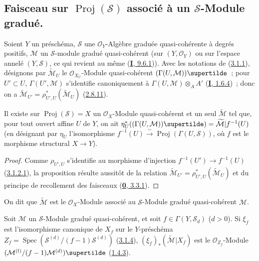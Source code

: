 \subsection{Faisceau sur $\operatorname{Proj}(\mathcal{S})$ associé à un
$\mathcal{S}$-Module gradué.}
\label{subsection:II.3.2-fr}

\begin{env}[3.2.1]
\label{II.3.2.1-fr}
Soient $Y$ un préschéma, $\mathcal{S}$ une $\mathcal{O}_Y$-Algèbre graduée
quasi-cohérente à degrés positifs, $\mathcal{M}$ un $\mathcal{S}$-module
gradué quasi-cohérent (sur $(Y,\mathcal{O}_Y)$ ou sur l'espace annelé
$(Y,\mathcal{S})$, ce qui revient au même
(\hyperref[I.9.6.1-fr]{\textbf{I}, 9.6.1})). Avec les notations de
(\hyperref[II.3.1.1-fr]{3.1.1}), désignons par $\widetilde{\mathcal{M}}_U$ le
$\mathcal{O}_{X_U}$-Module quasi-cohérent
$(\Gamma(U,\mathcal{M}))\supertilde$~; pour $U'\subset U$,
$\Gamma(U',\mathcal{M})$ s'identifie canoniquement à
$\Gamma(U,\mathcal{M})\otimes_A A'$ (\hyperref[I.1.6.4-fr]{\textbf{I}, 1.6.4})~; donc
on a $\widetilde{\mathcal{M}}_{U'}
=\rho_{U',U}^*(\widetilde{\mathcal{M}}_U)$
(\hyperref[II.2.8.11-fr]{2.8.11}).
\end{env}

\begin{proposition}[3.2.2]
\label{II.3.2.2-fr}
Il existe sur $\operatorname{Proj}(\mathcal{S})=X$ un
$\mathcal{O}_X$-Module quasi-cohérent et un seul $\widetilde{\mathcal{M}}$ tel
que, pour tout ouvert affine $U$ de $Y$, on ait
$\eta_U^*((\Gamma(U,\mathcal{M}))\supertilde)
=\widetilde{\mathcal{M}}|f^{-1}(U)$
(en désignant par $\eta_U$ l'isomorphisme
$f^{-1}(U)\xrightarrow{\sim}\operatorname{Proj}(\Gamma(U,\mathcal{S}))$, où
$f$ est le morphisme structural $X\to Y$).
\end{proposition}

\begin{proof}
Comme $\rho_{U',U}$ s'identifie au morphisme d'injection
$f^{-1}(U')\to f^{-1}(U)$ (\hyperref[II.3.1.2.1-fr]{3.1.2.1}), la proposition
résulte aussitôt de la relation
$\widetilde{\mathcal{M}}_{U'}=\rho_{U',U}^*(\widetilde{\mathcal{M}}_U)$ et du
principe de recollement des faisceaux (\hyperref[0.3.3.1-fr]{\textbf{0}, 3.3.1}).
\end{proof}

On dit que $\widetilde{\mathcal{M}}$ est le $\mathcal{O}_X$-Module associé au
$\mathcal{S}$-Module gradué quasi-cohérent $\mathcal{M}$.

\begin{proposition}[3.2.3]
\label{II.3.2.3-fr}
Soit $\mathcal{M}$ un $\mathcal{S}$-Module gradué quasi-cohérent, et soit
$f\in\Gamma(Y,\mathcal{S}_d)$ ($d>0$). Si $\xi_f$ est l'isomorphisme canonique
de $X_f$ sur le $Y$-préschéma
$Z_f=\operatorname{Spec}(\mathcal{S}^{(d)}/(f-1)\mathcal{S}^{(d)})$
\textup{(\hyperref[II.3.1.4-fr]{3.1.4})}, $(\xi_f)_*(\widetilde{\mathcal{M}}|X_f)$ est
le $\mathcal{O}_{Z_f}$-Module
$(\mathcal{M}^{(l)}/(f-1)\mathcal{M}^{(d)})\supertilde$
\textup{(\hyperref[II.1.4.3-fr]{1.4.3})}.
\end{proposition}

